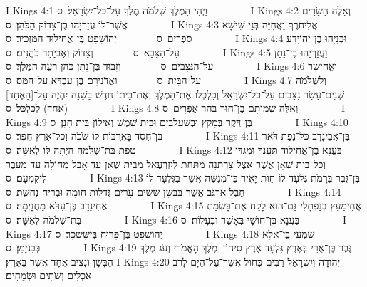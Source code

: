 I Kings 4:1	וַיְהִי הַמֶּלֶךְ שְׁלֹמֹה מֶלֶךְ עַל־כּל־יִשְׂרָאֵל׃ {ס}        
I Kings 4:2	וְאֵלֶּה הַשָּׂרִים אֲשֶׁר־לוֹ עֲזַרְיָהוּ בֶן־צָדוֹק הַכֹּהֵן׃ {ס}        
I Kings 4:3	אֱלִיחֹרֶף וַאֲחִיָּה בְּנֵי שִׁישָׁא סֹפְרִים {ס}        יְהוֹשָׁפָט בֶּן־אֲחִילוּד הַמַּזְכִּיר׃ {ס}        
I Kings 4:4	וּבְנָיָהוּ בֶן־יְהוֹיָדָע עַל־הַצָּבָא {ס}        וְצָדוֹק וְאֶבְיָתָר כֹּהֲנִים׃ {ס}        
I Kings 4:5	וַעֲזַרְיָהוּ בֶן־נָתָן עַל־הַנִּצָּבִים {ס}        וְזָבוּד בֶּן־נָתָן כֹּהֵן רֵעֶה הַמֶּלֶךְ׃ {ס}        
I Kings 4:6	וַאֲחִישָׁר עַל־הַבָּיִת {ס}        וַאֲדֹנִירָם בֶּן־עַבְדָּא עַל־הַמַּס׃ {ס}        
I Kings 4:7	וְלִשְׁלֹמֹה שְׁנֵים־עָשָׂר נִצָּבִים עַל־כּל־יִשְׂרָאֵל וְכִלְכְּלוּ אֶת־הַמֶּלֶךְ וְאֶת־בֵּיתוֹ חֹדֶשׁ בַּשָּׁנָה יִהְיֶה עַל־[הָאֶחָד] (אחד) לְכַלְכֵּל׃ {ס}        
I Kings 4:8	וְאֵלֶּה שְׁמוֹתָם בֶּן־חוּר בְּהַר אֶפְרָיִם׃ {ס}        
I Kings 4:9	בֶּן־דֶּקֶר בְּמָקַץ וּבְשַׁעַלְבִים וּבֵית שָׁמֶשׁ וְאֵילוֹן בֵּית חָנָן׃ {ס}        
I Kings 4:10	בֶּן־חֶסֶד בָּאֲרֻבּוֹת לוֹ שֹׂכֹה וְכל־אֶרֶץ חֵפֶר׃ {ס}        
I Kings 4:11	בֶּן־אֲבִינָדָב כּל־נָפַת דֹּאר טָפַת בַּת־שְׁלֹמֹה הָיְתָה לּוֹ לְאִשָּׁה׃ {ס}        
I Kings 4:12	בַּעֲנָא בֶּן־אֲחִילוּד תַּעְנַךְ וּמְגִדּוֹ וְכל־בֵּית שְׁאָן אֲשֶׁר אֵצֶל צָרְתַנָה מִתַּחַת לְיִזְרְעֶאל מִבֵּית שְׁאָן עַד אָבֵל מְחוֹלָה עַד מֵעֵבֶר לְיקְמְעָם׃ {ס}        
I Kings 4:13	בֶּן־גֶּבֶר בְּרָמֹת גִּלְעָד לוֹ חַוֺּת יָאִיר בֶּן־מְנַשֶּׁה אֲשֶׁר בַּגִּלְעָד לוֹ חֶבֶל אַרְגֹּב אֲשֶׁר בַּבָּשָׁן שִׁשִּׁים עָרִים גְּדֹלוֹת חוֹמָה וּבְרִיחַ נְחֹשֶׁת׃ {ס}        
I Kings 4:14	אֲחִינָדָב בֶּן־עִדֹּא מַחֲנָיְמָה׃ {ס}        
I Kings 4:15	אֲחִימַעַץ בְּנַפְתָּלִי גַּם־הוּא לָקַח אֶת־בָּשְׂמַת בַּת־שְׁלֹמֹה לְאִשָּׁה׃ {ס}        
I Kings 4:16	בַּעֲנָא בֶּן־חוּשָׁי בְּאָשֵׁר וּבְעָלוֹת׃ {ס}        
I Kings 4:17	יְהוֹשָׁפָט בֶּן־פָּרוּחַ בְּיִשָּׂשכָר׃ {ס}        
I Kings 4:18	שִׁמְעִי בֶן־אֵלָא בְּבִנְיָמִן׃ {ס}        
I Kings 4:19	גֶּבֶר בֶּן־אֻרִי בְּאֶרֶץ גִּלְעָד אֶרֶץ סִיחוֹן  מֶלֶךְ הָאֱמֹרִי וְעֹג מֶלֶךְ הַבָּשָׁן וּנְצִיב אֶחָד אֲשֶׁר בָּאָרֶץ׃
I Kings 4:20	יְהוּדָה וְיִשְׂרָאֵל רַבִּים כַּחוֹל אֲשֶׁר־עַל־הַיָּם לָרֹב אֹכְלִים וְשֹׁתִים וּשְׂמֵחִים׃
